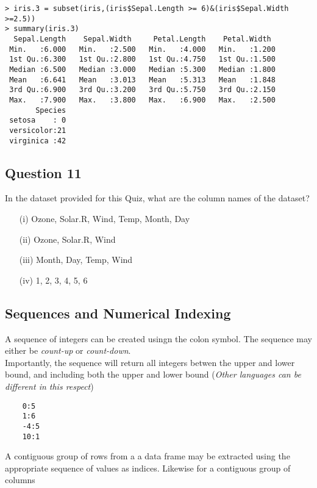 \documentclass[12pt]{article}
\begin{document}
\begin{verbatim}
> iris.3 = subset(iris,(iris$Sepal.Length >= 6)&(iris$Sepal.Width >=2.5))
> summary(iris.3)
  Sepal.Length    Sepal.Width     Petal.Length    Petal.Width   
 Min.   :6.000   Min.   :2.500   Min.   :4.000   Min.   :1.200  
 1st Qu.:6.300   1st Qu.:2.800   1st Qu.:4.750   1st Qu.:1.500  
 Median :6.500   Median :3.000   Median :5.300   Median :1.800  
 Mean   :6.641   Mean   :3.013   Mean   :5.313   Mean   :1.848  
 3rd Qu.:6.900   3rd Qu.:3.200   3rd Qu.:5.750   3rd Qu.:2.150  
 Max.   :7.900   Max.   :3.800   Max.   :6.900   Max.   :2.500  
       Species  
 setosa    : 0  
 versicolor:21  
 virginica :42  
\end{verbatim}

\newpage
\subsection*{Question 11}
\Large
In the dataset provided for this Quiz, what are the column names of the dataset?
\begin{itemize} 
\item[(i)] Ozone, Solar.R, Wind, Temp, Month, Day
\item[(ii)] Ozone, Solar.R, Wind
\item[(iii)] Month, Day, Temp, Wind
\item[(iv)] 1, 2, 3, 4, 5, 6
\end{itemize}

\newpage
\subsection*{Sequences and Numerical Indexing}
\Large

A sequence of integers can be created usingn the colon symbol. The sequence may either be \textit{count-up} or \textit{count-down}.
\\
Importantly, the sequence will return all integers betwen the upper and lower bound, and including both the upper and lower bound (\textit{Other languages can be different in this respect})
\begin{framed}
	\begin{verbatim}
	0:5
	1:6
	-4:5
	10:1
	\end{verbatim}
\end{framed}

\noindent A contiguous group of rows from a a data frame may be extracted using the appropriate sequence of values as indices. Likewise for a contiguous group of columns
\end{document}
